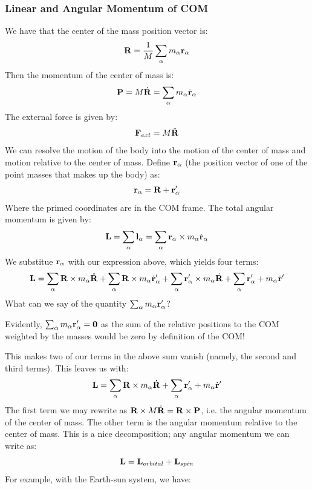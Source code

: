 \documentclass[../PHYS306Notes.tex]{subfiles}
\begin{document}
\subsubsection{Linear and Angular Momentum of COM}
We have that the center of the mass position vector is:
\[\mathbf{R} = \frac{1}{M}\sum_{\alpha}m_\alpha\mathbf{r}_\alpha\]
Then the momentum of the center of mass is:
\[\mathbf{P} = M\dot{\mathbf{R}} = \sum_{\alpha}m_\alpha\dot{\mathbf{r}}_{\alpha}\]
The external force is given by:
\[\mathbf{F}_{ext} = M\ddot{\mathbf{R}}\]
We can resolve the motion of the body into the motion of the center of mass and motion relative to the center of mass. Define $\mathbf{r}_\alpha$ (the position vector of one of the point masses that makes up the body) as:
\[\mathbf{r}_\alpha = \mathbf{R} + \mathbf{r}_\alpha'\]
Where the primed coordinates are in the COM frame. The total angular momentum is given by:
\[\mathbf{L} = \sum_\alpha\mathbf{l}_\alpha = \sum_\alpha\mathbf{r}_\alpha \times m_\alpha \dot{\mathbf{r}}_\alpha\]
We substitue $\mathbf{r}_\alpha$ with our expression above, which yields four terms:
\[\mathbf{L} = \sum_\alpha \mathbf{R} \times m_\alpha\mathbf{\dot{R}} + \sum_\alpha \mathbf{R} \times m_\alpha\dot{\mathbf{r}}_\alpha' + \sum_\alpha \mathbf{r}_\alpha' \times m_\alpha \dot{\mathbf{R}} + \sum_\alpha \mathbf{r}_\alpha' + m_\alpha \dot{\mathbf{r}}'\]
What can we say of the quantity $\sum_\alpha m_\alpha\mathbf{r}_\alpha'$?
\begin{s}
Evidently, $\sum_\alpha m_\alpha\mathbf{r}_\alpha' = \mathbf{0}$ as the sum of the relative positions to the COM weighted by the masses would be zero by definition of the COM!
\end{s}
This makes two of our terms in the above sum vanish (namely, the second and third terms). This leaves us with:
\[\mathbf{L} = \sum_\alpha \mathbf{R} \times m_\alpha\mathbf{\dot{R}} + \sum_\alpha \mathbf{r}_\alpha' + m_\alpha \dot{\mathbf{r}}'\]
The first term we may rewrite as $\mathbf{R} \times M\dot{\mathbf{R}} = \mathbf{R} \times \mathbf{P}$, i.e. the angular momentum of the center of mass. The other term is the angular momentum relative to the center of mass. This is a nice decomposition; any angular momentum we can write as:
\[\mathbf{L} = \mathbf{L}_{orbital} + \mathbf{L}_{spin}\]
For example, with the Earth-sun system, we have:
\end{document}
